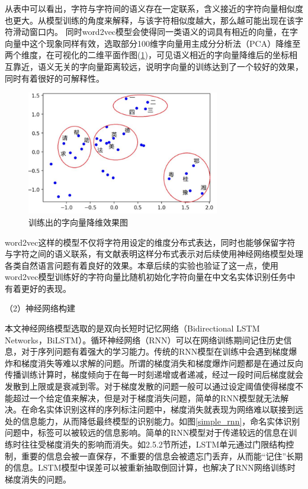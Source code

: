 \documentclass[winfonts,master,oneside,nobackinfo]{njuthesis}
\begin{document}
从表中可以看出，字符与字符间的语义存在一定联系，含义接近的字符向量相似度也更大。从模型训练的角度来解释，与该字符相似度越大，那么越可能出现在该字符滑动窗口内。
同时word2vec模型会使得同一类语义的词具有相近的向量，在字向量中这个现象同样有效，选取部分100维字向量用主成分分析法（PCA）降维至两个维度，在可视化的二维平面作图(\ref{charVecPCA})，可见语义相近的字向量降维后的坐标相互靠近，语义无关的字向量距离较远，说明字向量的训练达到了一个较好的效果，同时有着很好的可解释性。

\begin{figure}[h]
\centering
\includegraphics[width=0.75\textwidth]{./figure/字向量降维.jpg}
\caption{训练出的字向量降维效果图}
\label{charVecPCA}
\end{figure}

word2vec这样的模型不仅将字符用设定的维度分布式表达，同时也能够保留字符与字符之间的语义联系，有文献\cite{Yoon}表明这样分布式表示对后续使用神经网络模型处理各类自然语言问题有着良好的效果。本章后续的实验也验证了这一点，使用word2vec模型训练好的字符向量比随机初始化字符向量在中文名实体识别任务中有着更好的表现。

（2）神经网络构建

本文神经网络模型选取的是双向长短时记忆网络（Bidirectional LSTM Networks，BiLSTM）。循环神经网络（RNN）可以在网络训练期间记住历史信息，对于序列问题有着强大的学习能力。传统的RNN模型在训练中会遇到梯度爆炸和梯度消失等难以求解的问题。所谓的梯度消失和梯度爆炸问题都是在通过反向传播训练计算时，梯度倾向于在每一时刻递增或者递减，经过一段时间后梯度就会发散到上限或是衰减到零。对于梯度发散的问题一般可以通过设定阈值使得梯度不能超过一个给定值来解决，但是对于梯度消失问题，简单的RNN模型就无法解决。在命名实体识别这样的序列标注问题中，梯度消失就表现为网络难以联接到远处的信息能力，从而降低最终模型的识别能力。如图\ref{simple_rnn}，命名实体识别问题中，标签可以被较远的信息影响。简单的RNN模型对于传递较远的信息在训练时往往受梯度消失的影响而消失。如2.5.2节所述，LSTM单元通过门限结构控制，重要的信息会被一直保存，不重要的信息会被遗忘门丢弃，从而能“记住”长期的信息。LSTM模型中误差可以被重新抽取倒回计算，也解决了RNN网络训练时梯度消失的问题。
\end{document}
